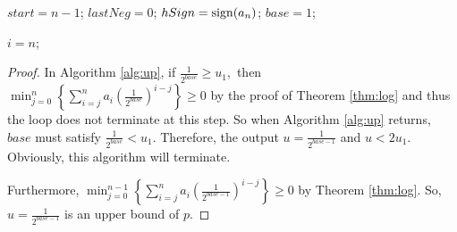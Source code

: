 \begin{algorithm}[H]
\caption{\up \label{alg:up}}
\DontPrintSemicolon
{}
$start=n-1$;
$lastNeg=0$;
$hSign={\rm sign}(a_n)$;
$base=1$;\;



$i=n$;\;

\end{algorithm}

\begin{proof}
  In Algorithm \ref{alg:up}, if  $\frac{1}{2^{base}}\ge u_1,$ then $\min_{j=0}^{n}\left\{ \sum_{i=j}^na_i\left( {\frac{1}{2^{base}} }
  \right)^{i-j}\right \}\ge 0$ by the proof of Theorem \ref{thm:log} and thus %
  the loop does not terminate at this step.
  So when Algorithm \ref{alg:up} returns, $base$ must satisfy $\frac{1}{2^{base}}<u_1$. Therefore, the output $u=\frac{1}{2^{base-1}}$ and $u<2u_1$.
  Obviously, this algorithm will terminate.

  Furthermore,  $\min_{j=0}^{n-1}\left\{ \sum_{i=j}^na_i\left( {\frac{1}{2^{base-1}} } \right)^{i-j}\right \}\ge 0$ by Theorem \ref{thm:log}. So, $u=\frac{1}{2^{base-1}}$ is an upper bound of $p$.
\end{proof}


